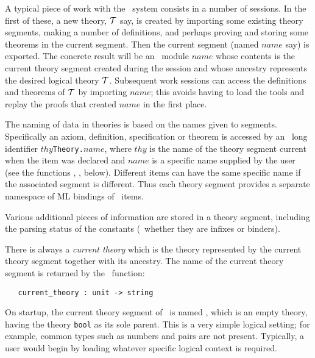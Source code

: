 A typical piece of work
with the \HOL\ system consists in a number of sessions.  In the first of these, a
new theory, ${\cal T}$ say, is created by importing some existing theory
segments, making a number of definitions, and perhaps proving and
storing some theorems in the current segment. Then the current segment
(named $name$ say) is exported. The concrete result will be an \ML\
module $name$ whose contents is the current theory segment
created during the session and whose ancestry represents the desired
logical theory ${\cal T}$. Subsequent work sessions can access the
definitions and theorems of ${\cal T}$ by importing $name$;
this avoids having to load the tools and replay
the proofs that created $name$\ml{Theory} in the first place.

The naming of data in theories is based on the names given to segments.
Specifically an axiom, definition, specification or theorem is
accessed
by an \ML\ long identifier $thy${\small\verb+Theory.+}$name$, where
$thy$ is the name of the theory segment current when the item was
declared and $name$ is a specific name supplied by the user (see the
functions \ml{new\_axiom}, \ml{new\_definition}, below). Different items
can have the same specific name if the associated segment is different.
Thus each theory segment provides a separate namespace of ML bindings of
\HOL\ items.

Various additional pieces of information are stored in a theory
segment, including the parsing status of the constants (\eg\ whether
they are infixes or binders).

There is always a \emph{current theory} which is the theory
represented by the current theory segment together with its
ancestry. The name of the current theory segment is returned by the \ML\
function:

\begin{boxed}
\begin{verbatim}
   current_theory : unit -> string
\end{verbatim}\end{boxed}

On startup, the current theory segment of \HOL\ is named ,
which is an empty theory, having the theory {\small\verb+bool+} as its sole
parent. This is a very simple logical setting; for example, common types
such as numbers and pairs are not present. Typically, a user would begin
by loading whatever specific logical context is required.

